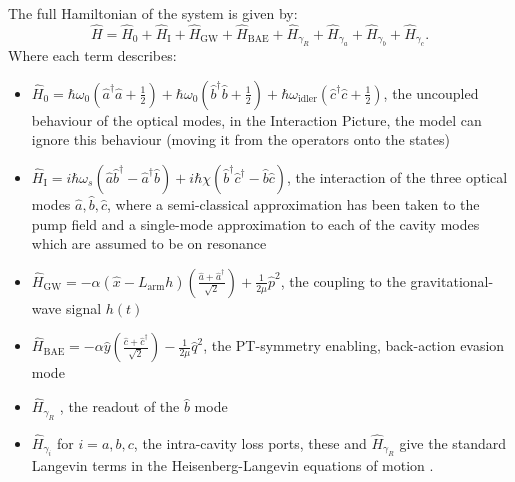 The full Hamiltonian of the system is given by: $$\hat{H}=\hat{H}_0+\hat{H}_\mathrm{I}+\hat{H}_{\mathrm{GW}}+\hat{H}_{\mathrm{BAE}}+\hat{H}_{\gamma_R}+\hat{H}_{\gamma_a}+\hat{H}_{\gamma_b}+\hat{H}_{\gamma_c}.$$ Where each term describes:
\begin{itemize}
\item $\hat{H}_0=\hbar\omega_0(\hat{a}^\dagger\hat{a}+\frac{1}{2})+\hbar\omega_0(\hat{b}^\dagger\hat{b}+\frac{1}{2})+\hbar\omega_\mathrm{idler}(\hat{c}^\dagger\hat{c}+\frac{1}{2})$, the uncoupled behaviour of the optical modes, in the Interaction Picture, the model can ignore this behaviour (moving it from the operators onto the states)  %
\item $\hat{H}_\mathrm{I}=i\hbar\omega_s(\hat{a}\hat{b}^\dag-\hat{a}^\dag\hat{b})+i\hbar\chi(\hat{b}^\dag\hat{c}^\dag-\hat{b}\hat{c})$, the interaction of the three optical modes $\hat{a}, \hat{b}, \hat{c}$, where a semi-classical approximation has been taken to the pump field  and a single-mode approximation to each of the cavity modes which are assumed to be on resonance 
\item $\hat{H}_\mathrm{GW}=-\alpha (\hat{x}-L_\mathrm{arm}h)(\frac{\hat{a}+\hat{a}^\dag}{\sqrt{2}})+\frac{1}{2\mu}\hat{p}^2$,  the coupling to the gravitational-wave signal $h(t)$ 
\item $\hat{H}_{\mathrm{BAE}}=-\alpha \hat{y}(\frac{\hat{c}+\hat{c}^\dag}{\sqrt{2}})-\frac{1}{2\mu}\hat{q}^2$, the PT-symmetry enabling, back-action evasion  mode
\item $\hat{H}_{\gamma_R}$ , the readout of the $\hat{b}$ mode
\item $\hat{H}_{\gamma_i}$ for $i=a,b,c$, the intra-cavity loss ports, these and $\hat{H}_{\gamma_R}$ give the standard  Langevin terms in the Heisenberg-Langevin equations of motion .
\end{itemize}

